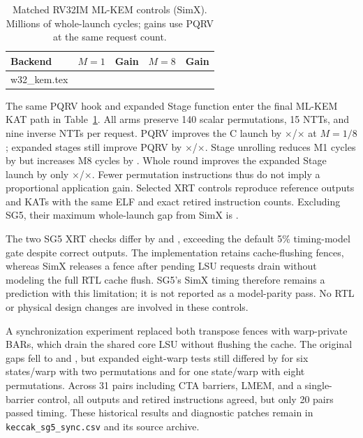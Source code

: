 \documentclass[conference,letterpaper]{IEEEtran}
\makeatletter
\newcommand{\tablerows}[1]{\@@input #1 }
\newcommand{\src}[1]{\par\smallskip{\scriptsize Source: \nolinkurl{#1}.}}
\makeatother
\begin{document}
\begin{table}[t]
\caption{Matched RV32IM ML-KEM controls (SimX). Millions of whole-launch
cycles; gains use PQRV at the same request count.}
\label{tab:w32kem}
\centering\footnotesize\setlength{\tabcolsep}{3pt}
\begin{tabular}{@{}lrrrr@{}}
\toprule
Backend & $M=1$ & Gain & $M=8$ & Gain \\
\midrule
\tablerows{w32_kem.tex}
\bottomrule
\end{tabular}
\src{pqc/results/mlkem_w32_controls.csv}
\end{table}

The same PQRV hook and expanded Stage function enter the final ML-KEM KAT
path in Table~\ref{tab:w32kem}. All arms preserve 140 scalar permutations,
15 NTTs, and nine inverse NTTs per request. PQRV improves the C launch by
\MatchedAsmGainOne{}$\times$/\MatchedAsmGainEight{}$\times$ at $M=1/8$;
expanded stages still improve PQRV by
\MatchedStageAsmGainOne{}$\times$/\MatchedStageAsmGainEight{}$\times$.
Stage unrolling reduces M1 cycles by \MatchedUnrollOneReduction{} but
increases M8 cycles by \MatchedUnrollEightIncrease{}. Whole round improves
the expanded Stage launch by only
\MatchedRoundKemGainOne{}$\times$/\MatchedRoundKemGainEight{}$\times$.
Fewer permutation instructions thus do not imply a proportional application
gain. Selected XRT controls reproduce reference outputs and KATs with the
same ELF and exact retired instruction counts. Excluding SG5, their maximum
whole-launch gap from SimX is \MatchedControlMaxXrtGap{}.

The two SG5 XRT checks differ by \MatchedSgFiveMinGap{} and
\MatchedSgFiveMaxGap{}, exceeding the default 5\% timing-model gate despite
correct outputs. The implementation retains cache-flushing fences, whereas
SimX releases a fence after pending LSU requests drain without modeling the
full RTL cache flush. SG5's SimX timing therefore remains a prediction with
this limitation; it is not reported as a model-parity pass. No RTL or physical
design changes are involved in these controls.

A synchronization experiment replaced both transpose fences with warp-private
BARs, which drain the shared core LSU without flushing the cache. The original
gaps fell to \SgFiveWarpGapOne{} and \SgFiveWarpGapTwo{}, but expanded
eight-warp tests still differed by \SgFiveWarpGapPacked{} for six states/warp
with two permutations and \SgFiveWarpGapSingle{} for one state/warp with
eight permutations. Across 31 pairs including CTA barriers, LMEM, and a
single-barrier control, all outputs and retired instructions agreed, but only
20 pairs passed timing. These historical results and diagnostic patches
remain in \texttt{keccak\_sg5\_sync.csv} and its source archive.
\end{document}
